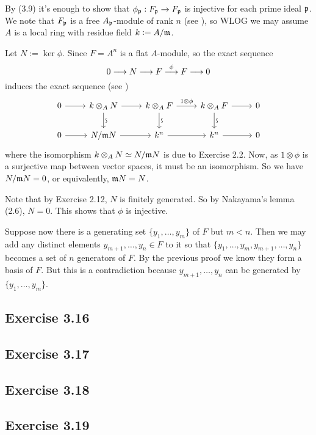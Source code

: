 \documentclass[../A&M.tex]{subfiles}
\begin{document}
By (3.9) it's enough to show that $\phi_{\mathfrak{p}}: F_{\mathfrak{p}} \to F_{\mathfrak{p}}$ is injective for each prime ideal $\mathfrak{p}$. We note that $F_{\mathfrak{p}}$ is a free $A_{\mathfrak{p}}$-module of rank $n$ (see ), so WLOG we may assume $A$ is a local ring with residue field $k:=A/\mathfrak{m}$.

Let $N:=\ker \phi$. Since $F=A^n$ is a flat $A$-module, so the exact sequence
$$
0 \longrightarrow N \longrightarrow F \overset{\phi}{\longrightarrow} F \longrightarrow 0
$$
induces the exact sequence (see )
$$
\begin{tikzcd}
0 \arrow{r} & k \otimes_A N \arrow{r} \visoarrow{d} & k \otimes_A F \arrow[r, "1 \otimes \phi"] \visoarrow{d} & k \otimes_A F \arrow{r} \visoarrow{d} & 0 \\ 
0 \arrow{r} & N/\mfk N \arrow{r} & k^n \arrow{r} & k^n \arrow[r] & 0
\end{tikzcd}
$$
where the isomorphism $k \otimes_A N \simeq N/\mathfrak{m} N$ is due to Exercise 2.2. Now, as $1 \otimes \phi$ is a surjective map between vector spaces, it must be an isomorphism. So we have $N/\mathfrak{m} N = 0$, or equivalently, $\mathfrak{m} N=N$.

Note that by Exercise 2.12, $N$ is finitely generated. So by Nakayama's lemma (2.6), $N=0$. This shows that $\phi$ is injective.

Suppose now there is a generating set $\{y_1,\ldots,y_m\}$ of $F$ but $m<n$. Then we may add any distinct elements $y_{m+1},\ldots,y_n \in F$ to it so that $\{y_1,\ldots,y_m,y_{m+1},\ldots,y_n\}$ becomes a set of $n$ generators of $F$. By the previous proof we know they form a basis of $F$. But this is a contradiction because $y_{m+1},\ldots,y_n$ can be generated by $\{y_1,\ldots,y_m\}$.

\subsection*{Exercise 3.16}

\subsection*{Exercise 3.17}

\subsection*{Exercise 3.18}

\subsection*{Exercise 3.19}
\end{document}
